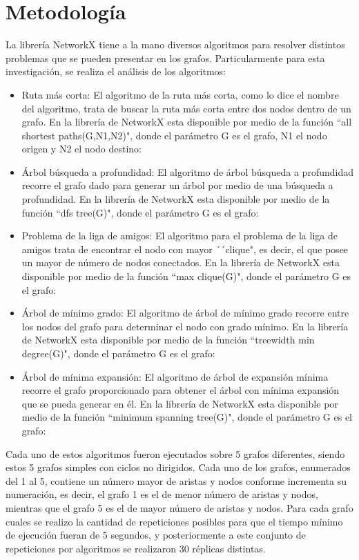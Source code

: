 \documentclass{article}
\begin{document}
\section{Metodología}
La librería NetworkX tiene a la mano diversos algoritmos para resolver distintos problemas que se pueden presentar en los grafos. Particularmente para esta investigación, se realiza el análisis de los algoritmos:
\begin{itemize}
\item{Ruta más corta}: El algoritmo de la ruta más corta, como lo dice el nombre del algoritmo, trata de buscar la ruta más corta entre dos nodos dentro de un grafo. En la librería de NetworkX esta disponible por medio de  la función ``all shortest paths(G,N1,N2)", donde el parámetro G es el grafo, N1 el nodo origen y N2 el nodo destino:

\item{Árbol búsqueda a profundidad}:  El algoritmo de árbol búsqueda a profundidad recorre el grafo dado para generar un árbol por medio de una búsqueda a profundidad. En la librería de NetworkX esta disponible por medio de  la función ``dfs tree(G)", donde el parámetro G es el grafo:

\item{Problema de la liga de amigos}: El algoritmo para el problema de la liga de amigos trata de encontrar el nodo con mayor ´´clique", es decir, el que posee un mayor de número de nodos conectados. En la librería de NetworkX esta disponible por medio de  la función ``max clique(G)", donde el parámetro G es el grafo:

\item{Árbol de mínimo grado}: El algoritmo de árbol de mínimo grado recorre entre los nodos del grafo para determinar el nodo con grado mínimo. En la librería de NetworkX esta disponible por medio de  la función ``treewidth min degree(G)", donde el parámetro G es el grafo:

\item{Árbol de mínima expansión}: El algoritmo de árbol de expansión mínima recorre el grafo proporcionado para obtener el árbol con mínima expansión que se pueda generar en él. En la librería de NetworkX esta disponible por medio de  la función ``minimum spanning tree(G)", donde el parámetro G es el grafo:

\end{itemize}
Cada uno de estos algoritmos fueron ejecutados sobre 5 grafos diferentes, siendo estos 5 grafos simples con ciclos no dirigidos. Cada uno de los grafos, enumerados del 1 al 5, contiene un número mayor de aristas y nodos conforme incrementa su numeración, es decir, el grafo 1 es el de menor número de aristas y nodos, mientras  que el grafo 5 es el de mayor número de aristas y nodos. Para cada grafo cuales se realizo la cantidad de repeticiones posibles para que el tiempo mínimo de ejecución fueran de 5 segundos, y posteriormente a este conjunto de repeticiones por algoritmos se realizaron 30 réplicas distintas. 
\end{document}
